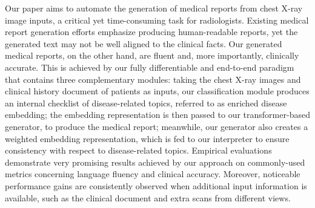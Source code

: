 Our paper aims to automate the generation of medical reports from chest X-ray image inputs, a critical yet time-consuming task for radiologists. Existing medical report generation efforts emphasize producing human-readable reports, yet the generated text may not be well aligned to the clinical facts. Our generated medical reports, on the other hand, are fluent and, more importantly, clinically accurate. This is achieved by our fully differentiable and end-to-end paradigm that contains three complementary modules: taking the chest X-ray images and clinical history document of patients as inputs, our classification module produces an internal checklist of disease-related topics, referred to as enriched disease embedding; the embedding representation is then passed to our transformer-based generator, to produce the medical report; meanwhile, our generator also creates a weighted embedding representation, which is fed to our interpreter to ensure consistency with respect to disease-related topics. Empirical evaluations demonstrate very promising results achieved by our approach on commonly-used metrics concerning language fluency and clinical accuracy. Moreover, noticeable performance gains are consistently observed when additional input information is available, such as the clinical document and extra scans from different views.
